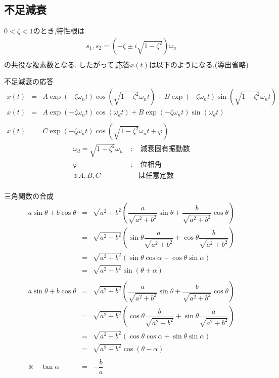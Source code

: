 \documentclass[a4paper]{jsarticle}
\begin{document}
\subsection{不足減衰}
$0<\zeta<1$のとき,特性根は
\begin{eqnarray*}
    s_1,s_2=\left(-\zeta \pm i\sqrt{1-\zeta^2}\right)\omega_n\\
\end{eqnarray*}
の共役な複素数となる.
したがって,応答$x\left(t\right)$は以下のようになる.(導出省略)
\begin{itembox}[l]{不足減衰の応答}
    \begin{eqnarray*}
        x\left(t\right)&=&A\exp{\left(-\zeta \omega_nt\right)}\cos{\left(\sqrt{1-\zeta^2}\omega_nt\right)}+B\exp{\left(-\zeta \omega_nt\right)}\sin{\left(\sqrt{1-\zeta^2}\omega_nt\right)}\\
        x\left(t\right)&=&A\exp{\left(-\zeta \omega_nt\right)}\cos{\left(\omega_dt\right)}+B\exp{\left(-\zeta \omega_nt\right)}\sin{\left(\omega_dt\right)}\\
        \\
        x\left(t\right)&=&C\exp{\left(-\zeta \omega_nt\right)}\cos\left(\sqrt{1-\zeta^2}\omega_nt+\varphi\right)
    \end{eqnarray*}
    \begin{eqnarray*}
        \omega_d=\sqrt{1-\zeta^2}\omega_n\;&:&\;減衰固有振動数\\
        \varphi\;&:&\;位相角\\
        ※ A,B,C&&は任意定数\\
    \end{eqnarray*}
\end{itembox}
\begin{itembox}[l]{三角関数の合成}
    \begin{eqnarray*}
        a\sin\theta+b\cos\theta
        &=&\sqrt{a^2+b^2}\left(\dfrac{a}{\sqrt{a^2+b^2}}\sin\theta+\dfrac{b}{\sqrt{a^2+b^2}}\cos\theta\right)\\
        &=&\sqrt{a^2+b^2}\left(\sin\theta\dfrac{a}{\sqrt{a^2+b^2}}+\cos\theta\dfrac{b}{\sqrt{a^2+b^2}}\right)\\
        &=&\sqrt{a^2+b^2}\left(\sin\theta\cos\alpha+\cos\theta\sin\alpha\right)\\
        &=&\sqrt{a^2+b^2}\sin\left(\theta+\alpha\right)\\
        \\
        a\sin\theta+b\cos\theta
        &=&\sqrt{a^2+b^2}\left(\dfrac{a}{\sqrt{a^2+b^2}}\sin\theta+\dfrac{b}{\sqrt{a^2+b^2}}\cos\theta\right)\\
        &=&\sqrt{a^2+b^2}\left(\cos\theta\dfrac{b}{\sqrt{a^2+b^2}}+\sin\theta\dfrac{a}{\sqrt{a^2+b^2}}\right)\\
        &=&\sqrt{a^2+b^2}\left(\cos\theta\cos\alpha+\sin\theta\sin\alpha\right)\\
        &=&\sqrt{a^2+b^2}\cos\left(\theta-\alpha\right)\\
        \\
        ※\quad\tan\alpha &=& -\dfrac{b}{a}
    \end{eqnarray*}
\end{itembox}
\end{document}
